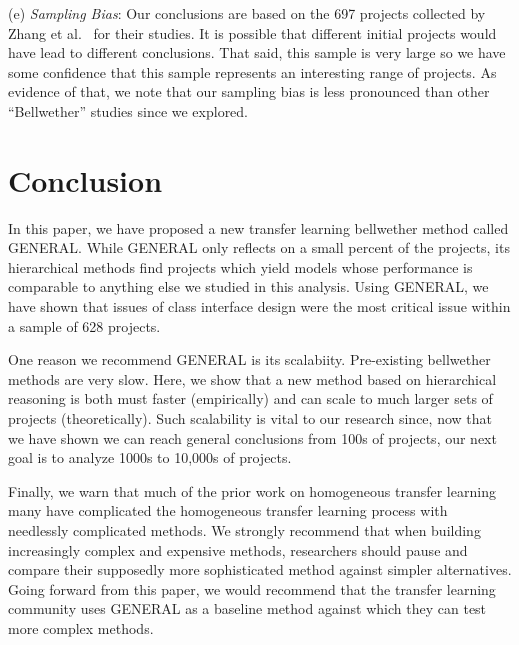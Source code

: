 \documentclass[10pt,journal,compsoc]{IEEEtran}
\begin{document}
(e) \textit{Sampling Bias}: Our conclusions are based on the 697 projects collected by Zhang et al.~\cite{zhang15} for their studies. It is possible that different initial projects would have lead to different conclusions. That said, this sample is very large so we have some confidence that this sample represents an interesting range of projects. As evidence of that, we note that our sampling bias is less pronounced than other ``Bellwether'' studies since we explored.
 



\section{Conclusion}
\label{sec:concl}
In this paper, we have proposed a new transfer learning  bellwether method   called GENERAL.
While GENERAL only reflects on a small percent of the projects,
its hierarchical methods find projects which yield models
whose performance is comparable to anything else we studied
in this analysis.
Using GENERAL, we have shown that issues
of class interface design were the most critical
issue within a sample of 628 projects.

One reason we recommend GENERAL is its scalabiity.
Pre-existing
bellwether methods are very slow. Here, we show
that a new method based on hierarchical reasoning
is both must faster (empirically) and can scale to much
larger sets of projects (theoretically). Such scalability
is vital to our research since, now that we have shown
we can reach general conclusions from 100s of projects,
our next goal is to analyze 1000s to 10,000s of projects.



Finally, we warn that much of the prior work on homogeneous transfer learning many  have complicated the homogeneous transfer learning process with needlessly
complicated methods.
  We strongly recommend that when building increasingly complex and expensive  methods, researchers should pause and compare their supposedly more sophisticated method against simpler alternatives. Going forward from this paper, we would recommend that the transfer learning community uses GENERAL as a baseline method against which they can test more complex methods.

\end{document}

